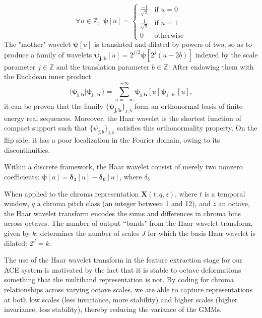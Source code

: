 \documentclass{article}
\begin{document}
\begin{equation}
\forall u \in \mathbb{Z}, \;
\boldsymbol{\psi}[u] = \left\{ \begin{array}{cl}
\frac{-1}{\sqrt{2}} & \mbox{if }u = 0\\
\frac{1}{\sqrt{2}} & \mbox{if }u = 1\\
0 & \mbox{otherwise}
\end{array}\right.
\end{equation}
The "mother" wavelet $\boldsymbol{\psi}[u]$ is translated and dilated by powers of two, so as to produce a family of wavelets $\boldsymbol{\psi_{j,b}}[u] = 2^{j/2} \boldsymbol{\psi}[2^j (u - 2b)]$ indexed by the scale parameter $j \in \mathbb{Z}$ and the translation parameter $b \in \mathbb{Z}$.
After endowing them with the Euclidean inner product
\begin{equation}
\langle \boldsymbol{\psi_{j,b}} \vert \boldsymbol{\psi_{j^\prime,b^\prime}} \rangle
 =
 \sum_{u = -\infty}^{+\infty}
 \boldsymbol{\psi_{j, b}}[u]
  \boldsymbol{\psi_{j^\prime,b^\prime}}[u],
\end{equation}
it can be proven that the family $\{\boldsymbol{\psi_{j,b}}\}_{j,b}$ form an orthonormal basis of finite-energy real sequences.
Moreover, the Haar wavelet is the shortest function of compact support such that $\{\psi_{j,b}\}_{j,b}$ satisfies this orthonormality property.
On the flip side, it has a poor localization in the Fourier domain, owing to its discontinuities.

Within a discrete framework, the Haar wavelet consist of merely two nonzero coefficients: 
$\boldsymbol{\psi}[u] = \boldsymbol{\delta_1}[u] - \boldsymbol{\delta_0}[u]$,
where $\delta_b$

When applied to the chroma representation $\boldsymbol{X}(t,q,z)$, where $t$ is a temporal window, $q$ a chroma pitch class (an integer between 1 and 12), and $z$ an octave, the Haar wavelet transform encodes the sums and differences in chroma bins across octaves.
The number of output ``bands" from the Haar wavelet transform, given by $k$, determines the number of scales $J$ for which the basis Haar wavelet is dilated: $2^J = k$.

The use of the Haar wavelet transform in the feature extraction stage for our ACE system is motivated by the fact that it is stable to octave deformations -- something that the multiband representation is not. By coding for chroma relationships across varying octave scales, we are able to capture representations at both low scales (less invariance, more stability) and higher scales (higher invariance, less stability), thereby reducing the variance of the GMMs. 
	
\end{document}
